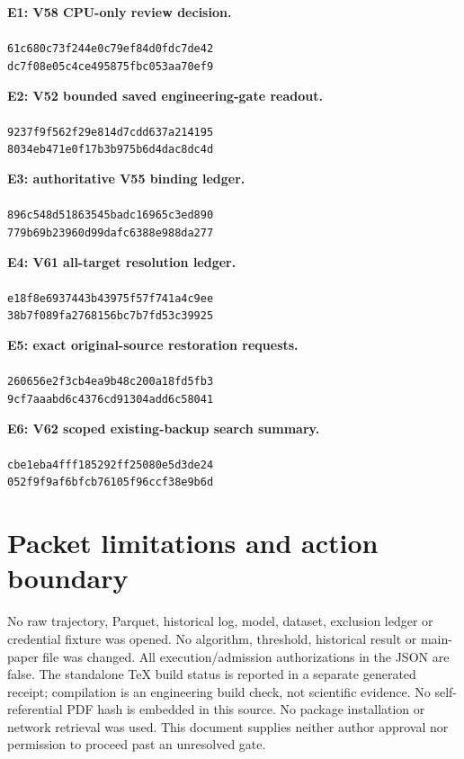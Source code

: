 \documentclass[10pt]{article}
\begin{document}
\textbf{E1: V58 CPU-only review decision.}\\
\\
\texttt{61c680c73f244e0c79ef84d0fdc7de42}\\
\texttt{dc7f08e05c4ce495875fbc053aa70ef9}

\textbf{E2: V52 bounded saved engineering-gate readout.}\\
\\
\texttt{9237f9f562f29e814d7cdd637a214195}\\
\texttt{8034eb471e0f17b3b975b6d4dac8dc4d}

\textbf{E3: authoritative V55 binding ledger.}\\
\\
\texttt{896c548d51863545badc16965c3ed890}\\
\texttt{779b69b23960d99dafc6388e988da277}

\textbf{E4: V61 all-target resolution ledger.}\\
\\
\texttt{e18f8e6937443b43975f57f741a4c9ee}\\
\texttt{38b7f089fa2768156bc7b7fd53c39925}

\textbf{E5: exact original-source restoration requests.}\\
\\
\texttt{260656e2f3cb4ea9b48c200a18fd5fb3}\\
\texttt{9cf7aaabd6c4376cd91304add6c58041}

\textbf{E6: V62 scoped existing-backup search summary.}\\
\\
\texttt{cbe1eba4fff185292ff25080e5d3de24}\\
\texttt{052f9f9af6bfcb76105f96ccf38e9b6d}

\section*{Packet limitations and action boundary}

No raw trajectory, Parquet, historical log, model, dataset, exclusion ledger or
credential fixture was opened. No algorithm, threshold, historical result or
main-paper file was changed. All execution/admission authorizations in the
JSON are false. The standalone TeX build status is reported in a separate
generated receipt; compilation is an engineering build check, not scientific
evidence. No self-referential PDF hash is embedded in this source. No package
installation or network retrieval was used. This document supplies neither
author approval nor permission to proceed past an unresolved gate.
\end{document}
